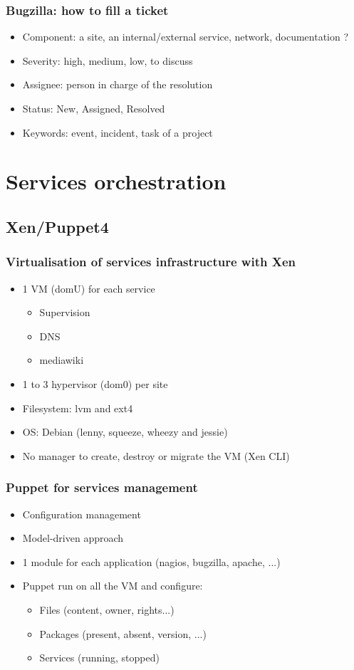 \documentclass[11pt,compress]{beamer}
\begin{document}
\begin{frame}
\frametitle{Bugzilla: how to fill a ticket}
\begin{itemize}
\item Component: a site, an internal/external service, network, documentation ?
\item Severity: high, medium, low, to discuss
\item Assignee: person in charge of the resolution
\item Status: New, Assigned, Resolved
\item Keywords: event, incident, task of a project
\end{itemize}
\end{frame}

\section{Services orchestration}
\subsection{Xen/Puppet4}
\begin{frame}
\frametitle{Virtualisation of services infrastructure with Xen}
\begin{itemize}
\item 1 VM (domU) for each service
\begin{itemize}
\item Supervision
\item DNS
\item mediawiki
\end{itemize}
\item 1 to 3 hypervisor (dom0) per site
\item Filesystem: lvm and ext4
\item OS: Debian (lenny, squeeze, wheezy and jessie)
\item No manager to create, destroy or migrate the VM (Xen CLI) 
\end{itemize}
\end{frame}

\begin{frame}
\frametitle{Puppet for services management}
\begin{itemize}
\item Configuration management
\item Model-driven approach
\item 1 module for each application (nagios, bugzilla, apache, ...)
\item Puppet run on all the VM and configure:
\begin{itemize}
\item Files (content, owner, rights...)
\item Packages (present, absent, version, ...)
\item Services (running, stopped)
\end{itemize}
\end{itemize}
\end{frame}
\end{document}
